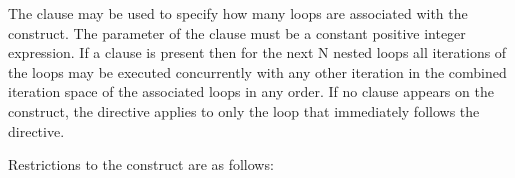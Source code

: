 
The  clause may be used to specify how many loops are associated
with the  construct. The parameter of the 
clause must be a constant positive integer expression. If a 
clause is present then for the next N nested loops all iterations of the loops
may be executed concurrently with any other iteration in the combined
iteration space of the associated loops in any order. If no 
clause appears on the construct, the  directive applies to
only the loop that immediately follows the directive.


\restrictions
Restrictions to the  construct are as follows:

